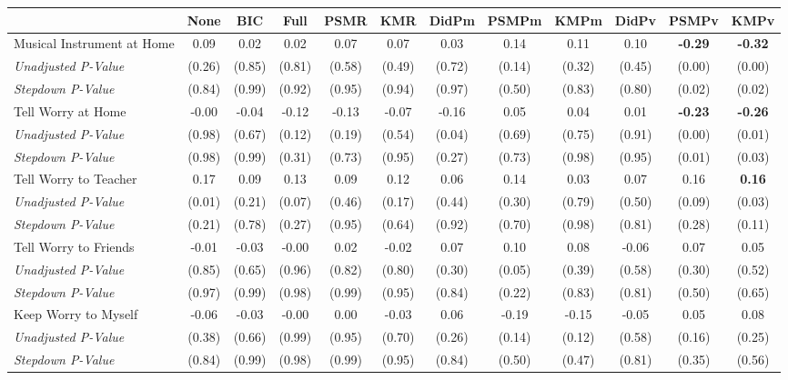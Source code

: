 \begin{tabular}{l c c c c c c c c c c c}
\toprule
 & None & BIC & Full & PSMR & KMR & DidPm & PSMPm & KMPm & DidPv & PSMPv & KMPv \\
\midrule
Musical Instrument at Home & 0.09 & 0.02 & 0.02 & 0.07 & 0.07 & 0.03 & 0.14 & 0.11 & 0.10 & \textbf{ -0.29 } & \textbf{ -0.32 } \\
\quad \textit{Unadjusted P-Value} & (0.26) & (0.85) & (0.81) & (0.58) & (0.49) & (0.72) & (0.14) & (0.32) & (0.45) & (0.00) & (0.00) \\
\quad \textit{Stepdown P-Value} & (0.84) & (0.99) & (0.92) & (0.95) & (0.94) & (0.97) & (0.50) & (0.83) & (0.80) & (0.02) & (0.02) \\
Tell Worry at Home & -0.00 & -0.04 & -0.12 & -0.13 & -0.07 & -0.16 & 0.05 & 0.04 & 0.01 & \textbf{ -0.23 } & \textbf{ -0.26 } \\
\quad \textit{Unadjusted P-Value} & (0.98) & (0.67) & (0.12) & (0.19) & (0.54) & (0.04) & (0.69) & (0.75) & (0.91) & (0.00) & (0.01) \\
\quad \textit{Stepdown P-Value} & (0.98) & (0.99) & (0.31) & (0.73) & (0.95) & (0.27) & (0.73) & (0.98) & (0.95) & (0.01) & (0.03) \\
Tell Worry to Teacher & 0.17 & 0.09 & 0.13 & 0.09 & 0.12 & 0.06 & 0.14 & 0.03 & 0.07 & 0.16 & \textbf{ 0.16 } \\
\quad \textit{Unadjusted P-Value} & (0.01) & (0.21) & (0.07) & (0.46) & (0.17) & (0.44) & (0.30) & (0.79) & (0.50) & (0.09) & (0.03) \\
\quad \textit{Stepdown P-Value} & (0.21) & (0.78) & (0.27) & (0.95) & (0.64) & (0.92) & (0.70) & (0.98) & (0.81) & (0.28) & (0.11) \\
Tell Worry to Friends & -0.01 & -0.03 & -0.00 & 0.02 & -0.02 & 0.07 & 0.10 & 0.08 & -0.06 & 0.07 & 0.05 \\
\quad \textit{Unadjusted P-Value} & (0.85) & (0.65) & (0.96) & (0.82) & (0.80) & (0.30) & (0.05) & (0.39) & (0.58) & (0.30) & (0.52) \\
\quad \textit{Stepdown P-Value} & (0.97) & (0.99) & (0.98) & (0.99) & (0.95) & (0.84) & (0.22) & (0.83) & (0.81) & (0.50) & (0.65) \\
Keep Worry to Myself & -0.06 & -0.03 & -0.00 & 0.00 & -0.03 & 0.06 & -0.19 & -0.15 & -0.05 & 0.05 & 0.08 \\
\quad \textit{Unadjusted P-Value} & (0.38) & (0.66) & (0.99) & (0.95) & (0.70) & (0.26) & (0.14) & (0.12) & (0.58) & (0.16) & (0.25) \\
\quad \textit{Stepdown P-Value} & (0.84) & (0.99) & (0.98) & (0.99) & (0.95) & (0.84) & (0.50) & (0.47) & (0.81) & (0.35) & (0.56) \\

\end{tabular}
